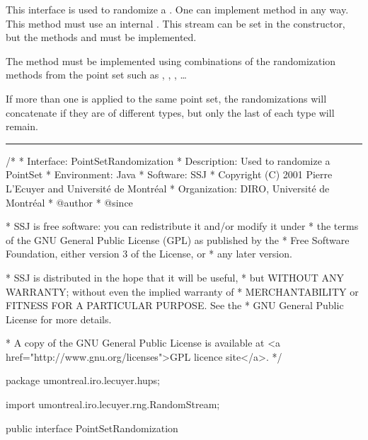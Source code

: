 
This interface is used to randomize a
. One can
implement method  in any way. This
method must use an internal
. This
stream can be set in the constructor, but the methods
 and  must be
implemented.

The method  must be implemented using
combinations of the randomization methods from the point set such
as
,
,
,
\hspace{1pt}\ldots

If more than one  is applied to the
same point set, the randomizations will concatenate if they are of
different types, but only the last of each type will remain.

\bigskip\hrule\bigskip

\begin{code}
\begin{hide}
/*
 * Interface:    PointSetRandomization
 * Description:  Used to randomize a PointSet
 * Environment:  Java
 * Software:     SSJ 
 * Copyright (C) 2001  Pierre L'Ecuyer and Université de Montréal
 * Organization: DIRO, Université de Montréal
 * @author       
 * @since

 * SSJ is free software: you can redistribute it and/or modify it under
 * the terms of the GNU General Public License (GPL) as published by the
 * Free Software Foundation, either version 3 of the License, or
 * any later version.

 * SSJ is distributed in the hope that it will be useful,
 * but WITHOUT ANY WARRANTY; without even the implied warranty of
 * MERCHANTABILITY or FITNESS FOR A PARTICULAR PURPOSE.  See the
 * GNU General Public License for more details.

 * A copy of the GNU General Public License is available at
   <a href="http://www.gnu.org/licenses">GPL licence site</a>.
 */
\end{hide}
package umontreal.iro.lecuyer.hups;
\begin{hide}
import umontreal.iro.lecuyer.rng.RandomStream;

\end{hide}
public interface PointSetRandomization \begin{hide} {
\end{hide}
\end{code}

